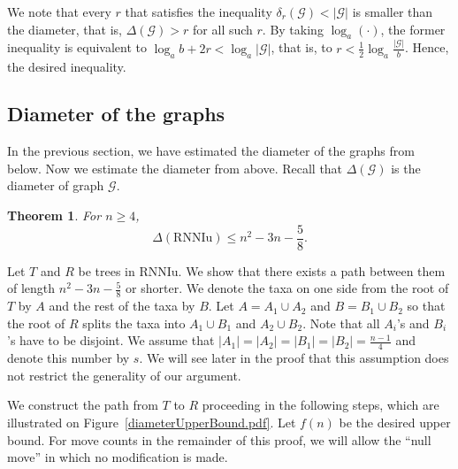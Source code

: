\documentclass[11pt]{amsart}
\newtheorem{theorem}[lemma]{Theorem}
\theoremstyle{definition}
\newcommand{\rnniu}{\mathrm{RNNIu}}
\newcommand{\G}{\mathcal{G}}
\begin{document}
\proof
We note that every $r$ that satisfies the inequality $\delta_r(\G) < |\G|$ is smaller than the diameter, that is, $\Delta(\G) > r$ for all such $r$.
By taking $\log_a(\cdot)$, the former inequality is equivalent to $\log_ab + 2r < \log_a|\G|$, that is, to $r < \frac 12 \log_a\frac{|\G|}{b}$.
Hence, the desired inequality.
\endproof


\subsection{Diameter of the graphs}

In the previous section, we have estimated the diameter of the graphs from below.
Now we estimate the diameter from above.
Recall that $\Delta(\G)$ is the diameter of graph $\G$.

\begin{theorem}
\label{diameterUpperBound}
For $n \ge 4$,
\[
\Delta(\rnniu) \le n^2 - 3n - \frac 58.
\]
\end{theorem}

\proof
Let $T$ and $R$ be trees in $\rnniu$.
We show that there exists a path between them of length $n^2 - 3n - \frac 58$ or shorter.
We denote the taxa on one side from the root of $T$ by $A$ and the rest of the taxa by $B$.
Let $A = A_1 \cup A_2$ and $B = B_1 \cup B_2$ so that the root of $R$ splits the taxa into $A_1 \cup B_1$ and $A_2 \cup B_2$.
Note that all $A_i$'s and $B_i$'s have to be disjoint.
We assume that $|A_1| = |A_2| = |B_1| = |B_2| = \frac{n-1}{4}$ and denote this number by $s$.
We will see later in the proof that this assumption does not restrict the generality of our argument.

We construct the path from $T$ to $R$ proceeding in the following steps, which are illustrated on Figure~\ref{diameterUpperBound.pdf}.
Let $f(n)$ be the desired upper bound.
For move counts in the remainder of this proof, we will allow the ``null move'' in which no modification is made.
\end{document}

